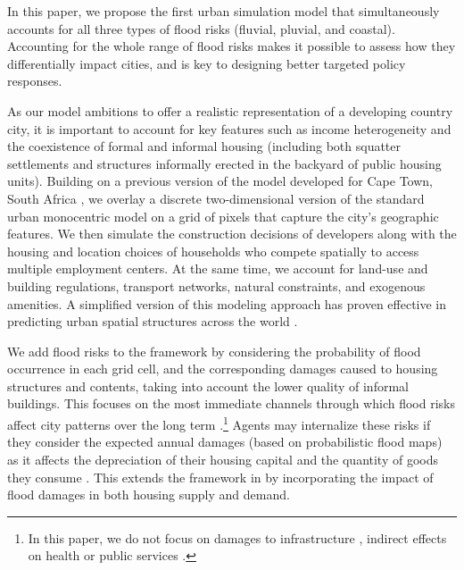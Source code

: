 \documentclass[12pt]{article}
\begin{document}
In this paper, we propose the first urban simulation model that simultaneously accounts for all three types of flood risks (fluvial, pluvial, and coastal). Accounting for the whole range of flood risks makes it possible to assess how they differentially impact cities, and is key to designing better targeted policy responses.

As our model ambitions to offer a realistic representation of a developing country city, it is important to account for key features such as income heterogeneity and the coexistence of formal and informal housing (including both squatter settlements and structures informally erected in the backyard of public housing units). Building on a previous version of the model developed for Cape Town, South Africa \citep{Pfeiffer2025AssessingHousing}, we overlay a discrete two-dimensional version of the standard urban monocentric model \citep{Fujita1989UrbanSize, Lin2024CitiesLevel} on a grid of pixels that capture the city's geographic features. We then simulate the construction decisions of developers along with the housing and location choices of households who compete spatially to access multiple employment centers. At the same time, we account for land-use and building regulations, transport networks, natural constraints, and exogenous amenities. A simplified version of this modeling approach has proven effective in predicting urban spatial structures across the world \citep{Liotta2022TestingCities}.


We add flood risks to the framework by considering the probability of flood occurrence in each grid cell, and the corresponding damages caused to housing structures and contents, taking into account the lower quality of informal buildings. This focuses on the most immediate channels through which flood risks affect city patterns over the long term \citep{Merz2010AssessmentDamage,Pharoah2014Built-inAfrica,Mosimann2018AContents}.\footnote{In this paper, we do not focus on damages to infrastructure \citep{Hallegatte2019Lifelines:Opportunity}, indirect effects on health \citep{Picarelli2017CholeraSalaam, Paterson2018HealthDisasters} or public services \citep{Hammond2015UrbanReview, Allaire2018Socio-economicLiterature}.} Agents may internalize these risks if they consider the expected annual damages (based on probabilistic flood maps) as it affects the depreciation of their housing capital and the quantity of goods they consume \citep{Huizinga2017GlobalGuidelines}. This extends the framework in \citet{Avner2022FloodEqual} by incorporating the impact of flood damages in both housing supply and demand.
\end{document}
